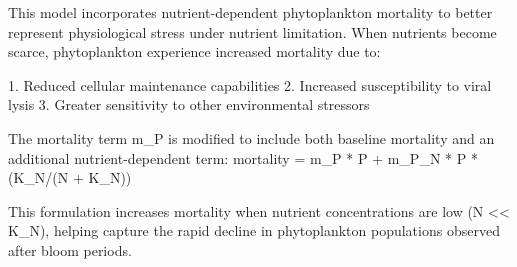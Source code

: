 This model incorporates nutrient-dependent phytoplankton mortality to better represent physiological stress under nutrient limitation. When nutrients become scarce, phytoplankton experience increased mortality due to:

1. Reduced cellular maintenance capabilities
2. Increased susceptibility to viral lysis
3. Greater sensitivity to other environmental stressors

The mortality term m_P is modified to include both baseline mortality and an additional nutrient-dependent term:
mortality = m_P * P + m_P_N * P * (K_N/(N + K_N))

This formulation increases mortality when nutrient concentrations are low (N << K_N), helping capture the rapid decline in phytoplankton populations observed after bloom periods.
